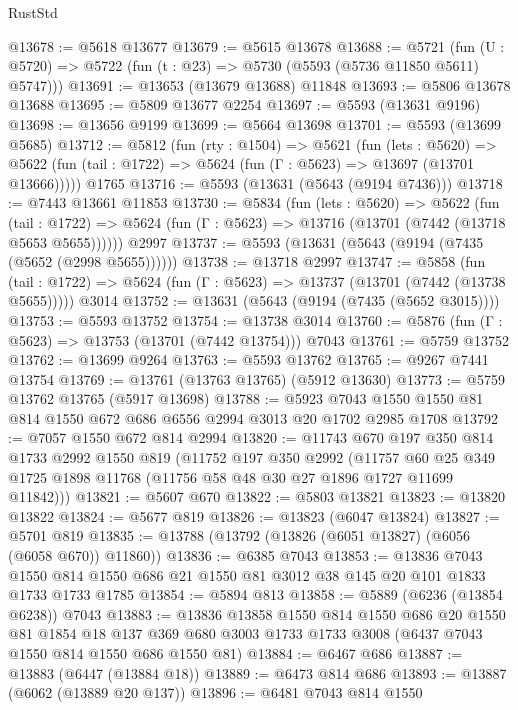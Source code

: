 \begin{lexlean}{RustStd}
\begin{coremodule}
@13678 := @5618 @13677
@13679 := @5615 @13678
@13688 := @5721
    (fun (U : @5720) => @5722 (fun (t : @23) => @5730 (@5593 (@5736 @11850 @5611) @5747)))
@13691 := @13653 (@13679 @13688) @11848
@13693 := @5806 @13678 @13688
@13695 := @5809 @13677 @2254
@13697 := @5593 (@13631 @9196)
@13698 := @13656 @9199
@13699 := @5664 @13698
@13701 := @5593 (@13699 @5685)
@13712 := @5812
    (fun (rty : @1504) =>
    @5621
      (fun (lets : @5620) =>
      @5622 (fun (tail : @1722) => @5624 (fun (Γ : @5623) => @13697 (@13701 @13666)))))
    @1765
@13716 := @5593 (@13631 (@5643 (@9194 @7436)))
@13718 := @7443 @13661 @11853
@13730 := @5834
    (fun (lets : @5620) =>
    @5622
      (fun (tail : @1722) =>
      @5624 (fun (Γ : @5623) => @13716 (@13701 (@7442 (@13718 @5653 @5655))))))
    @2997
@13737 := @5593 (@13631 (@5643 (@9194 (@7435 (@5652 (@2998 @5655))))))
@13738 := @13718 @2997
@13747 := @5858
    (fun (tail : @1722) => @5624 (fun (Γ : @5623) => @13737 (@13701 (@7442 (@13738 @5655)))))
    @3014
@13752 := @13631 (@5643 (@9194 (@7435 (@5652 @3015))))
@13753 := @5593 @13752
@13754 := @13738 @3014
@13760 := @5876 (fun (Γ : @5623) => @13753 (@13701 (@7442 @13754))) @7043
@13761 := @5759 @13752
@13762 := @13699 @9264
@13763 := @5593 @13762
@13765 := @9267 @7441 @13754
@13769 := @13761 (@13763 @13765) (@5912 @13630)
@13773 := @5759 @13762 @13765 (@5917 @13698)
@13788 := @5923 @7043 @1550 @1550 @81 @814 @1550 @672 @686 @6556 @2994 @3013 @20 @1702 @2985 @1708
@13792 := @7057 @1550 @672 @814 @2994
@13820 := @11743
    @670
    @197
    @350
    @814
    @1733
    @2992
    @1550
    @819
    (@11752
      @197
      @350
      @2992
      (@11757 @60 @25 @349 @1725 @1898 @11768 (@11756 @58 @48 @30 @27 @1896 @1727 @11699 @11842)))
@13821 := @5607 @670
@13822 := @5803 @13821
@13823 := @13820 @13822
@13824 := @5677 @819
@13826 := @13823 (@6047 @13824)
@13827 := @5701 @819
@13835 := @13788 (@13792 (@13826 (@6051 @13827) (@6056 (@6058 @670)) @11860))
@13836 := @6385 @7043
@13853 := @13836
    @7043
    @1550
    @814
    @1550
    @686
    @21
    @1550
    @81
    @3012
    @38
    @145
    @20
    @101
    @1833
    @1733
    @1733
    @1785
@13854 := @5894 @813
@13858 := @5889 (@6236 (@13854 @6238)) @7043
@13883 := @13836
    @13858
    @1550
    @814
    @1550
    @686
    @20
    @1550
    @81
    @1854
    @18
    @137
    @369
    @680
    @3003
    @1733
    @1733
    @3008
    (@6437 @7043 @1550 @814 @1550 @686 @1550 @81)
@13884 := @6467 @686
@13887 := @13883 (@6447 (@13884 @18))
@13889 := @6473 @814 @686
@13893 := @13887 (@6062 (@13889 @20 @137))
@13896 := @6481 @7043 @814 @1550

\end{coremodule}
\end{lexlean}

